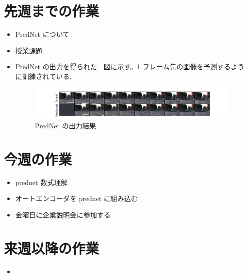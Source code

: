 \section{先週までの作業}
\begin{itemize}
          \item PredNet について
          \item 授業課題
          \item PredNet の出力を得られた　図に示す。1 フレーム先の画像を予測するように訓練されている.
\begin{figure}[hb]
\begin{center}
\includegraphics[scale=0.8]{plot_1.png}
\caption{PredNet の出力結果}
\end{center}
\end{figure}

\end{itemize}

\section{今週の作業}
\begin{itemize}       
         \item prednet 数式理解
         \item オートエンコーダを prednet に組み込む
         \item 金曜日に企業説明会に参加する
\end{itemize}

\section{来週以降の作業}
\begin{itemize}
         \item 
\end{itemize}





